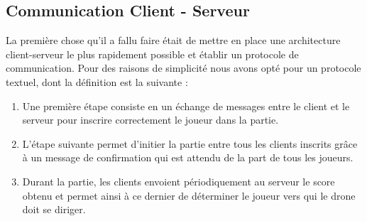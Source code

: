 \subsection{Communication Client - Serveur}

La première chose qu'il a fallu faire était de mettre en place une architecture client-serveur le plus rapidement possible et établir un protocole de communication. Pour des raisons de simplicité nous avons opté pour un protocole textuel, dont la définition est la suivante :
\begin{enumerate}
\item Une première étape consiste en un échange de messages entre le client et le serveur pour inscrire correctement le joueur dans la partie.
\item L'étape suivante permet d'initier la partie entre tous les clients inscrits grâce à un message de confirmation qui est attendu de la part de tous les joueurs.
\item Durant la partie, les clients envoient périodiquement au serveur le score obtenu et permet ainsi à ce dernier de déterminer le joueur vers qui le drone doit se diriger.
\end{enumerate}